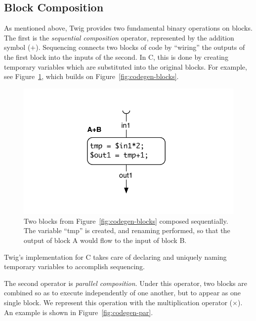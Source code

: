 \subsection{Block Composition}

As mentioned above, Twig provides two fundamental binary operations on blocks.
The first is the \emph{sequential composition} operator, represented by the
addition symbol ($+$). Sequencing connects two blocks of code by ``wiring'' the
outputs of the first block into the inputs of the second. In C, this is done by
creating temporary variables which are substituted into the original blocks. For
example, see Figure~\ref{fig:codegen-seq}, which builds on
Figure~\ref{fig:codegen-blocks}.

\begin{figure}[htbp]
\centering
\includegraphics[width=\columnwidth]{images/code-gen2}
\caption{Two blocks from Figure~\ref{fig:codegen-blocks} composed sequentially.
The variable ``tmp'' is created, and renaming performed, so that the output of
block A would flow to the input of block B.}
\label{fig:codegen-seq}
\end{figure}

Twig's implementation for C takes care of declaring and uniquely naming
temporary variables to accomplish sequencing.

The second operator is \emph{parallel composition}. Under this operator, two
blocks are combined so as to execute independently of one another, but to appear
as one single block. We represent this operation with the multiplication
operator ($\times$). An example is shown in Figure~\ref{fig:codegen-par}.

